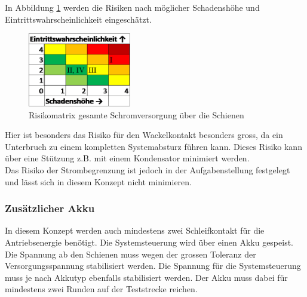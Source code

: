 \documentclass[../../main.tex]{subfiles}
\begin{document}
    In Abbildung \ref{fig:strom_risikomatrix_schienen} werden die Risiken nach möglicher Schadenshöhe und Eintrittswahrscheinlichkeit eingeschätzt.

    \begin{figure}[H]
        \centering
        \includegraphics[width=0.4\textwidth]{Strom_Risiko_Schienen.png}
        \caption {Risikomatrix gesamte Schromversorgung über die Schienen}
        \label{fig:strom_risikomatrix_schienen}
    \end{figure}

    Hier ist besonders das Risiko für den Wackelkontakt besonders gross, da ein Unterbruch zu einem kompletten Systemabsturz führen kann. Dieses Risiko kann über eine Stützung z.B. mit einem Kondensator minimiert werden.\\
    Das Risiko der Strombegrenzung ist jedoch in der Aufgabenstellung festgelegt und lässt sich in diesem Konzept nicht minimieren.

    \subsubsection{Zusätzlicher Akku}
    In diesem Konzept werden auch mindestens zwei Schleifkontakt für die Antriebsenergie benötigt. Die Systemsteuerung wird über einen Akku gespeist. Die Spannung ab den Schienen muss wegen der grossen Toleranz der Versorgungsspannung stabilisiert werden. Die Spannung für die Systemsteuerung muss je nach Akkutyp ebenfalls stabilisiert werden.
    Der Akku muss dabei für mindestens zwei Runden auf der Teststrecke reichen.
\end{document}
